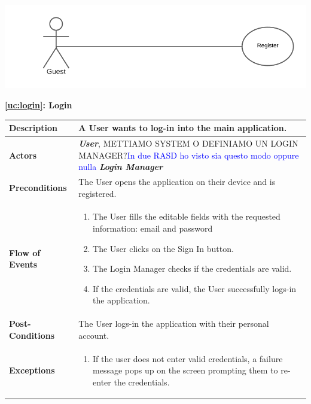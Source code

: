 \documentclass[a4paper, 10pt, oneside]{article}
\newcommand*{\lorenzo}[1]{\textcolor{BurntOrange}{#1}}
\newcommand{\giovanni}[1]{\textcolor{Blue}{#1}}
\begin{document}
\begin{minipage}{\linewidth}
            \centering
           \includegraphics[height=0.1\textheight, scale=0.2, keepaspectratio]{img/registration_use_case_diagram.png}
\end{minipage}

\begin{center}
{\textbf{\ref{uc:login}: Login}}
\end{center}
\begin{tabularx}{\linewidth}{| l | X |}
	
	\hline
	\textbf{Description} & A User wants to log-in into the main application.\\
	

	\hline
	\textbf{Actors} & \textbf{\textit{User}}, \lorenzo{METTIAMO SYSTEM O DEFINIAMO UN LOGIN MANAGER?}\giovanni{In due RASD ho visto sia questo modo oppure nulla} \textbf{\textit{Login Manager}}\\
	
	\hline
	\textbf{Preconditions} & The User opens the application on their device and is registered.\\
	
	\hline
	\textbf{Flow of Events} & \parbox{0.7\textwidth}{	
		\begin{enumerate}
			\item The User fills the editable fields with the requested information: email and password
			\item The User clicks on the Sign In button.
			\item The \lorenzo{Login Manager} checks if the credentials are valid. 
			\item If the credentials are valid, the User successfully logs-in the application.
	\end{enumerate}}\\
	
	\hline
	\textbf{Post-Conditions} & The User logs-in the application with their personal account.\\
	
	\hline
	\textbf{Exceptions} & \parbox{0.7\textwidth}{ \begin{enumerate}
			\item If the user does not enter valid credentials, a failure message pops up on the screen prompting them to re-enter the credentials.
		\end{enumerate}}\\

	\hline
	
\end{tabularx}
\end{document}
